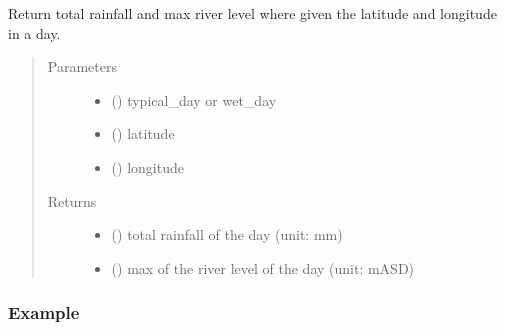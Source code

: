 \documentclass[letterpaper,10pt,english]{sphinxmanual}
\begin{document}
\begin{fulllineitems}
\label{\detokenize{index:flood_tool.get_rainfall_riverlevel_from_lat_lng}}
\sphinxAtStartPar
Return total rainfall and max river level where given the
latitude and longitude in a day.
\begin{quote}\begin{description}
\item[{Parameters}] \leavevmode\begin{itemize}
\item {} 
\sphinxAtStartPar
{} () \textendash{} typical\_day or wet\_day

\item {} 
\sphinxAtStartPar
{} () \textendash{} latitude

\item {} 
\sphinxAtStartPar
{} () \textendash{} longitude

\end{itemize}

\item[{Returns}] \leavevmode
\sphinxAtStartPar
\begin{itemize}
\item {} 
\sphinxAtStartPar
{} () \textendash{} total rainfall of the day (unit: mm)

\item {} 
\sphinxAtStartPar
{} () \textendash{} max of the river level of the day (unit: mASD)

\end{itemize}


\end{description}\end{quote}
\subsubsection*{Example}

\begin{sphinxVerbatim}[commandchars=\\\{\}]
     
\end{sphinxVerbatim}

\end{fulllineitems}
\end{document}
